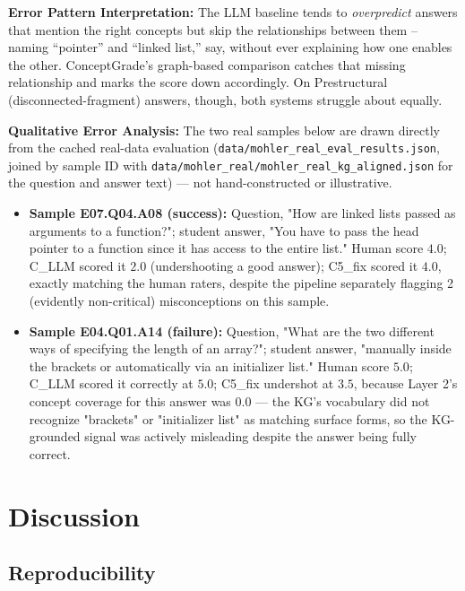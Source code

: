 \documentclass[conference]{IEEEtran}
\begin{document}
\textbf{Error Pattern Interpretation:} The LLM baseline tends to
\emph{overpredict} answers that mention the right concepts but skip
the relationships between them -- naming ``pointer'' and ``linked
list,'' say, without ever explaining how one enables the other.
ConceptGrade's graph-based comparison catches that missing
relationship and marks the score down accordingly. On Prestructural
(disconnected-fragment) answers, though, both systems struggle about
equally.

\textbf{Qualitative Error Analysis:}
The two real samples below are drawn directly from the cached real-data
evaluation (\texttt{data/mohler\_real\_eval\_results.json}, joined by
sample ID with \texttt{data/mohler\_real/mohler\_real\_kg\_aligned.json}
for the question and answer text) --- not hand-constructed or
illustrative.
\begin{itemize}
  \item \textbf{Sample E07.Q04.A08 (success):} Question, "How are linked
        lists passed as arguments to a function?"; student answer, "You
        have to pass the head pointer to a function since it has access
        to the entire list." Human score $4.0$; C\_LLM scored it $2.0$
        (undershooting a good answer); C5\_fix scored it $4.0$, exactly
        matching the human raters, despite the pipeline separately
        flagging 2 (evidently non-critical) misconceptions on this
        sample.
  \item \textbf{Sample E04.Q01.A14 (failure):} Question, "What are the
        two different ways of specifying the length of an array?";
        student answer, "manually inside the brackets or automatically
        via an initializer list." Human score $5.0$; C\_LLM scored it
        correctly at $5.0$; C5\_fix undershot at $3.5$, because Layer 2's
        concept coverage for this answer was $0.0$ --- the KG's
        vocabulary did not recognize "brackets" or "initializer list" as
        matching surface forms, so the KG-grounded signal was actively
        misleading despite the answer being fully correct.
\end{itemize}

\section{Discussion}
\label{sec:discussion}

\subsection{Reproducibility}
\end{document}
